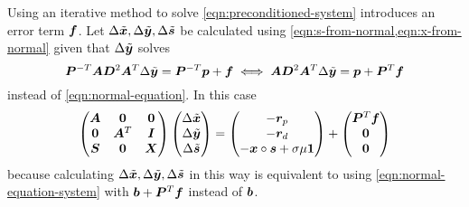 Using an iterative method to solve \cref{eqn:preconditioned-system} introduces an error term \(\bm{f}\). Let \(\Delta\tilde{\bm{x}}, \Delta\tilde{\bm{y}}, \Delta\tilde{\bm{s}}\) be calculated using \cref{eqn:s-from-normal,eqn:x-from-normal} given that \(\Delta\tilde{\bm{y}}\) solves
\begin{equation}
 \bm{P}^{-T} \bm{A} \bm{D}^2 \bm{A}^T \Delta\tilde{\bm{y}} = \bm{P}^{-T} \bm{p} + \bm{f} \iff \bm{A} \bm{D}^2 \bm{A}^T \Delta\tilde{\bm{y}} = \bm{p} + \bm{P}^{T} \bm{f}
\end{equation}
instead of \cref{eqn:normal-equation}. In this case
\begin{equation}
  \begin{pmatrix}
    \bm{A} & \bm{0}   & \bm{0} \\
    \bm{0} & \bm{A}^T & \bm{I} \\
    \bm{S} & \bm{0}   & \bm{X} \\
  \end{pmatrix}
  \begin{pmatrix} \Delta\tilde{\bm{x}} \\ \Delta\tilde{\bm{y}} \\ \Delta\tilde{\bm{s}} \end{pmatrix}
  =
  \begin{pmatrix} -\bm{r}_p \\ -\bm{r}_d \\ -\bm{x} \circ \bm{s} + \sigma \mu \bm{1} \end{pmatrix}
  +
  \begin{pmatrix} \bm{P}^T \bm{f} \\ \bm{0} \\ \bm{0} \end{pmatrix}
\end{equation}
because calculating \(\Delta\tilde{\bm{x}}, \Delta\tilde{\bm{y}}, \Delta\tilde{\bm{s}}\) in this way is equivalent to using \cref{eqn:normal-equation-system} with \(\bm{b} + \bm{P}^T \bm{f}\) instead of \(\bm{b}\).

